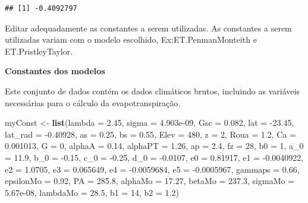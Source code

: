 \documentclass[
]{book}
\newenvironment{Shaded}{\begin{snugshade}}{\end{snugshade}}
\newcommand{\DataTypeTok}[1]{\textcolor[rgb]{0.13,0.29,0.53}{#1}}
\newcommand{\DecValTok}[1]{\textcolor[rgb]{0.00,0.00,0.81}{#1}}
\newcommand{\FloatTok}[1]{\textcolor[rgb]{0.00,0.00,0.81}{#1}}
\newcommand{\KeywordTok}[1]{\textcolor[rgb]{0.13,0.29,0.53}{\textbf{#1}}}
\newcommand{\NormalTok}[1]{#1}
\newcommand{\StringTok}[1]{\textcolor[rgb]{0.31,0.60,0.02}{#1}}
\begin{document}
\begin{verbatim}
## [1] -0.4092797
\end{verbatim}

Editar adequadamente as constantes a serem utilizadas. As constantes a serem utilizadas variam com o modelo escolhido, Ex:ET.PenmanMonteith e ET.PristleyTaylor.

\textbf{Constantes dos modelos}

Este conjunto de dados contém os dados climáticos brutos, incluindo as variáveis necessárias para o cálculo da evapotranspiração.

\begin{Shaded}
\begin{Highlighting}[]
\NormalTok{myConst <-}\StringTok{ }\KeywordTok{list}\NormalTok{(}\DataTypeTok{lambda =} \FloatTok{2.45}\NormalTok{, }\DataTypeTok{sigma =} \FloatTok{4.903e-09}\NormalTok{, }\DataTypeTok{Gsc =} \FloatTok{0.082}\NormalTok{, }
                \DataTypeTok{lat =} \FloatTok{-23.45}\NormalTok{, }\DataTypeTok{lat_rad =} \FloatTok{-0.40928}\NormalTok{, }\DataTypeTok{as =} \FloatTok{0.25}\NormalTok{, }
                \DataTypeTok{bs =} \FloatTok{0.55}\NormalTok{, }\DataTypeTok{Elev =} \DecValTok{480}\NormalTok{, }\DataTypeTok{z =} \DecValTok{2}\NormalTok{, }\DataTypeTok{Roua =} \FloatTok{1.2}\NormalTok{, }
                \DataTypeTok{Ca =} \FloatTok{0.001013}\NormalTok{, }\DataTypeTok{G =} \DecValTok{0}\NormalTok{, }
                \DataTypeTok{alphaA =} \FloatTok{0.14}\NormalTok{, }\DataTypeTok{alphaPT =} \FloatTok{1.26}\NormalTok{, }
                \DataTypeTok{ap =} \FloatTok{2.4}\NormalTok{, }\DataTypeTok{fz =} \DecValTok{28}\NormalTok{, }\DataTypeTok{b0 =} \DecValTok{1}\NormalTok{, }
                \DataTypeTok{a_0 =} \FloatTok{11.9}\NormalTok{, }\DataTypeTok{b_0 =} \FloatTok{-0.15}\NormalTok{, }
                \DataTypeTok{c_0 =} \FloatTok{-0.25}\NormalTok{, }\DataTypeTok{d_0 =} \FloatTok{-0.0107}\NormalTok{, }
                \DataTypeTok{e0 =} \FloatTok{0.81917}\NormalTok{,  }
                \DataTypeTok{e1 =} \FloatTok{-0.0040922}\NormalTok{, }\DataTypeTok{e2 =} \FloatTok{1.0705}\NormalTok{, }\DataTypeTok{e3 =} \FloatTok{0.065649}\NormalTok{, }
                \DataTypeTok{e4 =} \FloatTok{-0.0059684}\NormalTok{, }
                \DataTypeTok{e5 =} \FloatTok{-0.0005967}\NormalTok{, }\DataTypeTok{gammaps =} \FloatTok{0.66}\NormalTok{, }
                \DataTypeTok{epsilonMo =} \FloatTok{0.92}\NormalTok{, }\DataTypeTok{PA =} \FloatTok{285.8}\NormalTok{, }
                \DataTypeTok{alphaMo =} \FloatTok{17.27}\NormalTok{, }\DataTypeTok{betaMo =} \FloatTok{237.3}\NormalTok{, }
                \DataTypeTok{sigmaMo =} \FloatTok{5.67e-08}\NormalTok{, }\DataTypeTok{lambdaMo =} \FloatTok{28.5}\NormalTok{, }
                \DataTypeTok{b1 =} \DecValTok{14}\NormalTok{, }\DataTypeTok{b2 =} \FloatTok{1.2}\NormalTok{)}
\end{Highlighting}
\end{Shaded}
\end{document}
